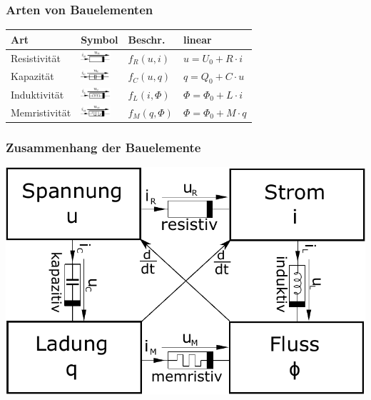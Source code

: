 \documentclass[fs, footer]{latex4ei}
\begin{document}
\begin{multicols*}{4}
    \subsubsection{Arten von Bauelementen}
    \begin{tabular}{l|l|l|l}
        Art           & Symbol                                                  & Beschr.       & linear                      \\ \hline
        Resistivität  & \includegraphics[height=0.4cm]{./img/Resistivitat.pdf}  & $f_R(u,i)$    & $u = U_0 + R \cdot i$       \\
        Kapazität     & \includegraphics[height=0.4cm]{./img/Kapazivitat.pdf}   & $f_C(u,q)$    & $q = Q_0 + C \cdot u$       \\
        Induktivität  & \includegraphics[height=0.4cm]{./img/Induktivitat.pdf}  & $f_L(i,\Phi)$ & $\Phi = \Phi_0 + L \cdot i$ \\
        Memristivität & \includegraphics[height=0.4cm]{./img/Memristivitat.pdf} & $f_M(q,\Phi)$ & $\Phi = \Phi_0 + M \cdot q$ \\
    \end{tabular}
    \subsubsection{Zusammenhang der Bauelemente}
    \begin{center}
        \includegraphics[scale=0.3]{./img/reactance_overview.pdf}
    \end{center}

\end{multicols*}
\end{document}
